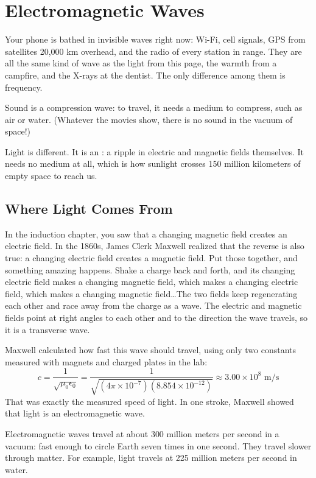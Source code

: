 \chapter{Electromagnetic Waves}

Your phone is bathed in invisible waves right now: Wi-Fi, cell signals,
GPS from satellites 20,000 km overhead, and the radio of every station in
range. They are all the same kind of wave as the light from this page, the
warmth from a campfire, and the X-rays at the dentist. The only difference
among them is frequency.

Sound is a compression wave: to travel, it needs a medium to compress,
such as air or water. (Whatever the movies show, there is no sound in the
vacuum of space!)

Light is different. It is an
: a ripple in electric and magnetic fields
themselves. It needs no medium at all, which is how sunlight crosses 150
million kilometers of empty space to reach us.

\section{Where Light Comes From}
In the induction chapter, you saw that a changing magnetic field creates an
electric field. In the 1860s, James Clerk Maxwell realized that the reverse
is also true: a changing electric field creates a magnetic field. Put those
together, and something amazing happens. Shake a charge back and forth, and
its changing electric field makes a changing magnetic field, which makes a
changing electric field, which makes a changing magnetic field\ldots The
two fields keep regenerating each other and race away from the charge as a
wave. The electric and magnetic fields point at right angles to each other
and to the direction the wave travels, so it is a transverse wave.

Maxwell calculated how fast this wave should travel, using only two
constants measured with magnets and charged plates in the lab:
$$c = \frac{1}{\sqrt{\mu_0 \epsilon_0}} = \frac{1}{\sqrt{(4\pi \times 10^{-7})(8.854 \times 10^{-12})}} \approx 3.00 \times 10^8 \text{ m/s}$$
That was exactly the measured speed of light. In one stroke, Maxwell
showed that light is an electromagnetic wave.

Electromagnetic waves travel at about 300 million
meters per second in a vacuum: fast enough to circle Earth seven times in
one second. They travel slower through matter. For example, light travels
at 225 million meters per second in water.


